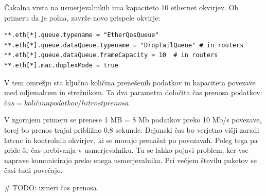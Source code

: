 \documentclass[11pt,a4paper,slovene]{myarticle}
\begin{document}
Čakalna vrsta na usmerjevalnikih ima kapaciteto 10 ethernet okvirjev. Ob primeru da je polna, zavrže novo prispele okvirje:
\begin{lstlisting}[h]
**.eth[*].queue.typename = "EtherQosQueue"
**.eth[*].queue.dataQueue.typename = "DropTailQueue" # in routers
**.eth[*].queue.dataQueue.frameCapacity = 10  # in routers
**.eth[*].mac.duplexMode = true
\end{lstlisting}

V tem omrežju sta ključna količina prenešenih podatkov in kapaciteta povezave med odjemalcem in strežnikom. Ta dva parametra določita čas prenosa podatkov:
$čas = količina podatkov / hitrost prenosa$

V zgornjem primeru se prenese 1 MB = 8 Mb podatkov preko 10 Mb/s povezave, torej bo prenos trajal približno 0,8 sekunde. Dejanski čas bo verjetno višji zaradi latenc in kontrolnih okvirjev, ki se morajo prenašat po povezavah.
Poleg tega pa pride še čas prebivanja v usmerjevalniku. Tu se lahko pojavi problem, ker vse naprave komunicirajo preko enega usmerjevalnika.
Pri večjem številu paketov se časi tudi povečajo.

# TODO: izmeri čas prenosa
\end{document}
